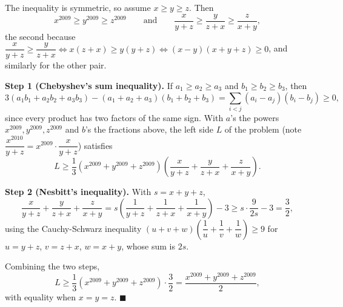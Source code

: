 The inequality is symmetric, so assume $x\ge y\ge z$. Then
\[x^{2009}\ge y^{2009}\ge z^{2009}\qquad\text{and}\qquad\dfrac{x}{y+z}\ge\dfrac{y}{z+x}\ge\dfrac{z}{x+y},\]
the second because $\dfrac{x}{y+z}\ge\dfrac{y}{z+x}\iff x(z+x)\ge y(y+z)\iff (x-y)(x+y+z)\ge0$, and similarly for the other pair.

\textbf{Step 1 (Chebyshev's sum inequality).} If $a_1\ge a_2\ge a_3$ and $b_1\ge b_2\ge b_3$, then
\[3(a_1b_1+a_2b_2+a_3b_3)-(a_1+a_2+a_3)(b_1+b_2+b_3)=\sum_{i<j}(a_i-a_j)(b_i-b_j)\ge0,\]
since every product has two factors of the same sign. With $a$'s the powers $x^{2009},y^{2009},z^{2009}$ and $b$'s the fractions above, the left side $L$ of the problem (note $\dfrac{x^{2010}}{y+z}=x^{2009}\cdot\dfrac{x}{y+z}$) satisfies
\[L\ge\dfrac{1}{3}\left(x^{2009}+y^{2009}+z^{2009}\right)\left(\dfrac{x}{y+z}+\dfrac{y}{z+x}+\dfrac{z}{x+y}\right).\]

\textbf{Step 2 (Nesbitt's inequality).} With $s=x+y+z$,
\[\dfrac{x}{y+z}+\dfrac{y}{z+x}+\dfrac{z}{x+y}=s\left(\dfrac{1}{y+z}+\dfrac{1}{z+x}+\dfrac{1}{x+y}\right)-3\ge s\cdot\dfrac{9}{2s}-3=\dfrac{3}{2},\]
using the Cauchy-Schwarz inequality $\left(u+v+w\right)\left(\dfrac{1}{u}+\dfrac{1}{v}+\dfrac{1}{w}\right)\ge9$ for $u=y+z$, $v=z+x$, $w=x+y$, whose sum is $2s$.

Combining the two steps,
\[L\ge\dfrac{1}{3}\left(x^{2009}+y^{2009}+z^{2009}\right)\cdot\dfrac{3}{2}=\dfrac{x^{2009}+y^{2009}+z^{2009}}{2},\]
with equality when $x=y=z$. $\blacksquare$
